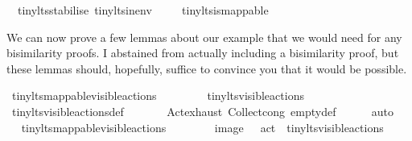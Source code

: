 \begin{isabellebody}
\ \ tiny{\isacharunderscore}{\kern0pt}lts{\isachardot}{\kern0pt}stabilise\ tiny{\isacharunderscore}{\kern0pt}lts{\isachardot}{\kern0pt}in{\isacharunderscore}{\kern0pt}env\ \isanewline
\ \ \isamarkupfalse%
\ tiny{\isacharunderscore}{\kern0pt}lts{\isachardot}{\kern0pt}is{\isacharunderscore}{\kern0pt}mappable\ \isacommand{{\isachardot}{\kern0pt}}\isamarkupfalse%
\isanewline
%
\isanewline
%
\endisatagvisible
{\isafoldvisible}%
%
\isadelimvisible
%
\endisadelimvisible
%
\begin{isamarkuptext}%
We can now prove a few lemmas about our example \LTSt{} that we would need for any bisimilarity proofs. I abstained from actually including a bisimilarity proof, but these lemmas should, hopefully, suffice to convince you that it would be possible.%
\end{isamarkuptext}\isamarkuptrue%
%
\isadelimvisible
%
\endisadelimvisible
%
\isatagvisible
{}\isamarkupfalse%
\ {\isacartoucheopen}tiny{\isacharunderscore}{\kern0pt}lts{\isacharunderscore}{\kern0pt}mappable{\isachardot}{\kern0pt}visible{\isacharunderscore}{\kern0pt}actions\ {\isacharequal}{\kern0pt}\ {\isasymemptyset}{\isacartoucheclose}\ \isanewline
{}\isamarkupfalse%
\ {\isacharminus}{\kern0pt}\isanewline
\ \ \isamarkupfalse%
\ {\isacartoucheopen}tiny{\isacharunderscore}{\kern0pt}lts{\isachardot}{\kern0pt}visible{\isacharunderscore}{\kern0pt}actions\ {\isacharequal}{\kern0pt}\ {\isasymemptyset}{\isacartoucheclose}\isanewline
\ \ \ \ \isamarkupfalse%
\ tiny{\isacharunderscore}{\kern0pt}lts{\isachardot}{\kern0pt}visible{\isacharunderscore}{\kern0pt}actions{\isacharunderscore}{\kern0pt}def\ \isanewline
\ \ \ \ \ \ Act{\isachardot}{\kern0pt}exhaust\ Collect{\isacharunderscore}{\kern0pt}cong\ empty{\isacharunderscore}{\kern0pt}def\isanewline
\ \ \ \ \isamarkupfalse%
\ auto\isanewline
\ \ \isamarkupfalse%
\ \isamarkupfalse%
\ {\isacartoucheopen}tiny{\isacharunderscore}{\kern0pt}lts{\isacharunderscore}{\kern0pt}mappable{\isachardot}{\kern0pt}visible{\isacharunderscore}{\kern0pt}actions\ \isanewline
\ \ \ \ \ \ {\isacharequal}{\kern0pt}\ image\ {\isacharparenleft}{\kern0pt}{\isasymlambda}\ {\isasymalpha}{\isachardot}{\kern0pt}\ act\ {\isasymalpha}{\isacharparenright}{\kern0pt}\ tiny{\isacharunderscore}{\kern0pt}lts{\isachardot}{\kern0pt}visible{\isacharunderscore}{\kern0pt}actions{\isacartoucheclose}\isanewline
\ \ \ \ \isamarkupfalse%

\end{isabellebody}
